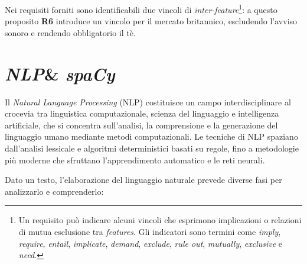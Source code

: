 \documentclass[12pt]{report}
\newcommand{\torevise}[1]{\textcolor{red}{#1}}
\newcommand{\spacy}{\textsl{spaCy}\xspace}
\newcommand{\nlp}{\textsl{NLP}\xspace}
\begin{document}
Nei requisiti forniti sono identificabili due vincoli di \textit{inter-feature}\footnote{Un requisito può indicare alcuni vincoli che esprimono implicazioni o relazioni di mutua esclusione tra \textit{features}. Gli indicatori sono termini come \textit{imply}, \textit{require}, \textit{entail}, \textit{implicate}, \textit{demand}, \textit{exclude}, \textit{rule out}, \textit{mutually}, \textit{exclusive} e \textit{need}.}: a questo proposito \textbf{R6} introduce un vincolo per il mercato britannico, escludendo l'avviso sonoro e rendendo obbligatorio il tè.


\clearpage\thispagestyle{empty}
\null\newpage




\chapter{\nlp \& \spacy}
\label{ch:nlp}
Il \textit{Natural Language Processing} (NLP) costituisce un campo interdisciplinare al crocevia tra linguistica computazionale, scienza del linguaggio e intelligenza artificiale, che si concentra sull'analisi, la comprensione e la generazione del linguaggio umano mediante metodi computazionali. Le tecniche di NLP spaziano dall'analisi lessicale e algoritmi deterministici basati su regole, fino a metodologie più moderne che sfruttano l'apprendimento automatico e le reti neurali.

Dato un testo, l'elaborazione del linguaggio naturale prevede diverse fasi per analizzarlo e comprenderlo:
\end{document}
